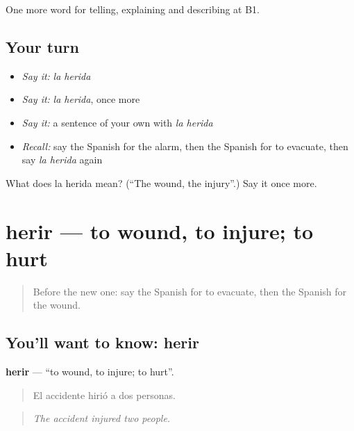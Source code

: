 \begin{grammarlens}[title={What you've built}]
One more word for telling, explaining and describing at B1.
\end{grammarlens}

\subsection*{Your turn}
\begin{itemize}
\raggedright
  \item \emph{Say it:} \emph{la herida}
  \item \emph{Say it:} \emph{la herida}, once more
  \item \emph{Say it:} a sentence of your own with \emph{la herida}
  \item \emph{Recall:} say the Spanish for the alarm, then the Spanish for to evacuate, then say \emph{la herida} again
\end{itemize}

\begin{tcolorbox}[breakable,colback=teal!4,colframe=teal!35!black,title={Before you move on}]
What does la herida mean? (\textquotedblleft{}The wound, the injury\textquotedblright{}.) Say it once more.
\end{tcolorbox}
\section[herir]{herir — to wound, to injure; to hurt}

\label{lesson:ES-C525-herir}



\begin{quote}
Before the new one: say the Spanish for to evacuate, then the Spanish for the wound.
\end{quote}

\subsection*{You'll want to know: herir}
\textbf{herir} — \textquotedblleft{}to wound, to injure; to hurt\textquotedblright{}.

\begin{quote}
El accidente hirió a dos personas.
\end{quote}

\begin{quote}
\emph{The accident injured two people.}
\end{quote}

